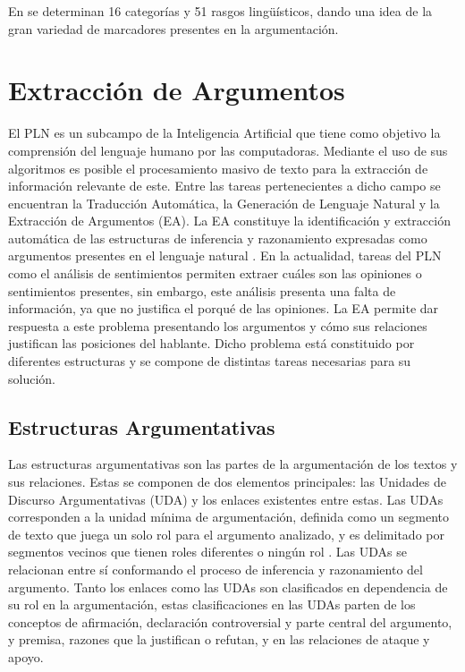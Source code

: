 \documentclass[a4paper,11pt,twocolumn,twoside]{article}
\begin{document}
En
\cite{venegas2005hacia}
se determinan 16 categorías y 51 rasgos lingüísticos, dando una idea 
de la gran variedad de marcadores presentes en la argumentación.

\section{Extracción de Argumentos}

El PLN es un subcampo de la Inteligencia Artificial que tiene como objetivo la comprensión 
del lenguaje humano por las computadoras. 
Mediante el uso de sus algoritmos es posible el procesamiento masivo de texto para la extracción de información 
relevante de este. Entre las tareas pertenecientes a dicho campo se encuentran la Traducción Automática, 
la Generación de Lenguaje Natural y la Extracción de Argumentos (EA). La EA constituye la identificación y extracción 
automática de las estructuras de inferencia y 
razonamiento expresadas como argumentos presentes en el lenguaje natural \cite{lawrence2020argument}.
En la actualidad, tareas del PLN como el análisis de sentimientos permiten 
extraer cuáles son las opiniones o sentimientos presentes, sin embargo, este análisis presenta una falta 
de información, ya que no justifica el porqué de las opiniones. La EA permite dar respuesta a este problema presentando
los argumentos y cómo sus relaciones justifican las posiciones del hablante. Dicho problema está constituido por diferentes 
estructuras y se compone de distintas tareas necesarias para su solución.

\subsection{Estructuras Argumentativas}

Las estructuras argumentativas son las partes de la argumentación de los textos y sus relaciones.
Estas se componen de dos elementos principales: las Unidades de Discurso Argumentativas (UDA) y los enlaces
existentes entre estas. Las UDAs corresponden a la unidad mínima de argumentación, definida 
como un segmento de texto que juega un solo rol para el argumento analizado, y es 
delimitado por segmentos vecinos que tienen roles diferentes o ningún rol \cite{stede2018argumentation}.
Las UDAs se relacionan entre sí conformando el proceso de inferencia y razonamiento del argumento.
Tanto los enlaces como las UDAs son clasificados en dependencia de su rol en la argumentación, estas clasificaciones 
en las UDAs parten de los conceptos de afirmación, declaración controversial y parte central del argumento, y premisa,
razones que la justifican o refutan, y en las relaciones de ataque y apoyo. 
\end{document}
